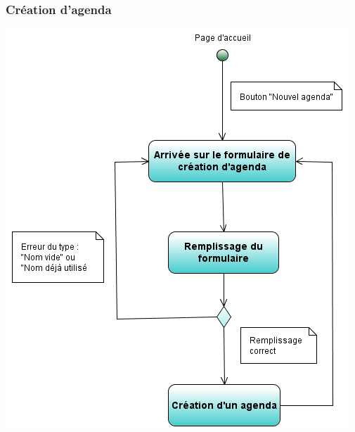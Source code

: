 \documentclass[12pt , a4paper]{article}
\begin{document}
\subsubsection{Création d'agenda}
\begin{center}
  \includegraphics[scale=0.6]{./images/diag_act_creation_agenda.png}
\end{center}
\end{document}
